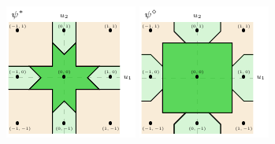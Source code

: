 \documentclass[twoside,11pt]{article}
\begin{document}
\begin{figure}
	\begin{center}
		\begin{minipage}{0.32\linewidth}
			\includegraphics[width=\linewidth]{tikz/lovasz-link-psi-star.pdf}
		\end{minipage}\hfill
		\begin{minipage}{0.32\linewidth}
			\includegraphics[width=\linewidth]{tikz/lovasz-link-psi-diamond.pdf}

\end{minipage}
\end{center}
\end{figure}
\end{document}
